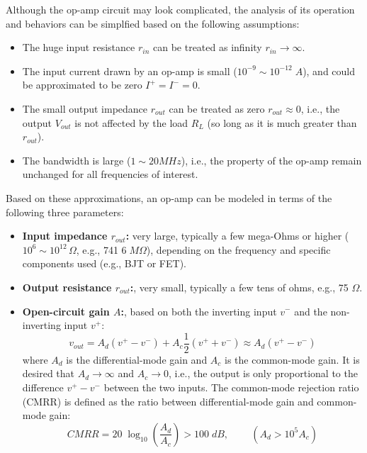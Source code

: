 \documentclass{article}
\begin{document}
Although the op-amp circuit may look complicated, the analysis of its
operation and behaviors can be simplfied based on the following assumptions:
\begin{itemize}
\item The huge input resistance $r_{in}$ can be treated as infinity 
  $r_{in}\rightarrow \infty$.
\item The input current drawn by an op-amp is small ($10^{-9}\sim10^{-12}\;A$), 
  and could be approximated to be zero $I^+=I^-=0$.
\item The small output impedance $r_{out}$ can be treated as zero $r_{out}\approx 0$,
  i.e., the output $V_{out}$ is not affected by the load $R_L$ (so long as it is
  much greater than $r_{out}$).
\item The bandwidth is large ($1 \sim 20MHz$), i.e., the property of the op-amp 
  remain unchanged for all frequencies of interest.

\end{itemize}

Based on these approximations, an op-amp can be modeled in terms of the
following three parameters:



\begin{itemize}
\item
  {\bf Input impedance $r_{out}$:} very large, typically a few mega-Ohms or
  higher ($10^6\sim 10^{12}\,\Omega$, e.g., 741 $6\;M\Omega$), depending on 
  the frequency and specific components used (e.g., BJT or FET).

\item {\bf Output resistance $r_{out}$:}, very small, typically a few tens of
  ohms, e.g., 75 $\Omega$.

\item {\bf Open-circuit gain $A$:}, based on both the inverting input $v^-$ 
  and the non-inverting input $v^+$:
  \begin{equation}
    v_{out}=A_d (v^+ - v^-)+A_c \frac{1}{2}(v^+ + v^-)\approx A_d (v^+ - v^-) 
  \end{equation}
  where $A_d$ is the differential-mode gain and $A_c$ is the common-mode gain.
  It is desired that $A_d\rightarrow \infty$ and $A_c\rightarrow 0$, i.e., the 
  output is only proportional to the difference $v^+-v^-$ between the two inputs. 
  The common-mode rejection ratio (CMRR) is defined as the ratio between 
  differential-mode gain and common-mode gain:
  \begin{equation}
    CMRR=20\;\log_{10} \left(\frac{A_d}{A_c}\right)>100\;dB,
    \;\;\;\;\;\;\;\;(A_d>10^5 A_c) 
  \end{equation}

\end{itemize}
\end{document}
